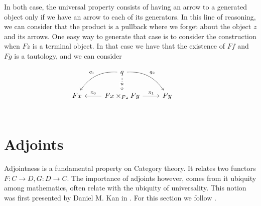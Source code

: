 In both case, the universal property consists of having an arrow to a generated object only if we have an arrow to each of its generators. In this line of reasoning, we can consider that the product is a pullback where we forget about the object $z$ and its arrows. One easy way to generate that case is to consider the construction when $Fz$ is a terminal object. In that case we have that the existence of $Ff$ and $Fg$ is a tautology, and we can consider 

\[
\begin{tikzcd}
& q
\arrow[bend left]{dr}{q_2}
\arrow[bend right,swap]{dl}{q_1}
\arrow[dashed]{d}[description]{u} & & \\
 Fx  & Fx\times_{Fz}Fy \arrow{r}{\pi_1} \arrow{l}[swap]{\pi_0}& Fy \\
\end{tikzcd}
\]








\section{Adjoints}

Adjointness is a fundamental property on Category theory. It relates two functors $F:C\to D, G:D\to C$. The importance of adjoints however, comes from it ubiquity among mathematics, often relate with the ubiquity of universality. This notion was first presented by Daniel M. Kan in \cite{kan1958adjoint}. For this section we follow \cite{mac2013categories}.\\

